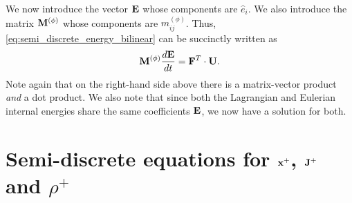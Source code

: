 \documentclass[11pt]{article}
\begin{document}
We now introduce the vector $\mathbf{E}$ whose components are $\hat{e}_i$. We also introduce the matrix $\mathbf{M}^{(\phi)}$ whose components are $m_{ij}^{(\phi)}$. Thus, \cref{eq:semi_discrete_energy_bilinear} can be succinctly written as
\begin{equation}
    \mathbf{M}^{(\phi)} \frac{d\mathbf{E}}{dt} = \mathbf{F}^T \cdot \mathbf{U}.
\end{equation}
Note again that on the right-hand side above there is a matrix-vector product \textit{and} a dot product. We also note that since both the Lagrangian and Eulerian internal energies share the same coefficients $\mathbf{E}$, we now have a solution for both.

\section{Semi-discrete equations for $\mathbf{x}^+$, $\mathbf{J}^+$ and $\rho^+$}
\end{document}
